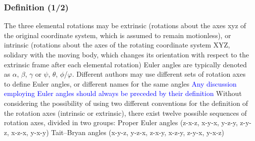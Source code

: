 \begin{frame}
 \frametitle{Definition \hfill(1/2)}
 \begin{outline}
  \1 The three elemental rotations may be extrinsic (rotations about the axes xyz of the original coordinate system, which is assumed to remain motionless), or intrinsic
     (rotations about the axes of the rotating coordinate system XYZ, solidary with the moving body, which changes its orientation with respect to the extrinsic frame after each
     elemental rotation)
  \1 Euler angles are typically denoted as $\alpha$, $\beta$, $\gamma$ or $\psi$, $\theta$, $\phi$/$\varphi$. Different authors may use different sets of rotation axes to define
     Euler angles, or different names for the same angles
  \1 \textcolor{blue}{Any discussion employing Euler angles should always be preceded by their definition}
  \1 Without considering the possibility of using two different conventions for the definition of the rotation axes (intrinsic or extrinsic), there exist twelve possible
     sequences of rotation axes, divided in two groups:
  \2 Proper Euler angles (z-x-z, x-y-x, y-z-y, z-y-z, x-z-x, y-x-y)
  \2 Tait–Bryan angles (x-y-z, y-z-x, z-x-y, x-z-y, z-y-x, y-x-z)
 \end{outline}
\end{frame}
